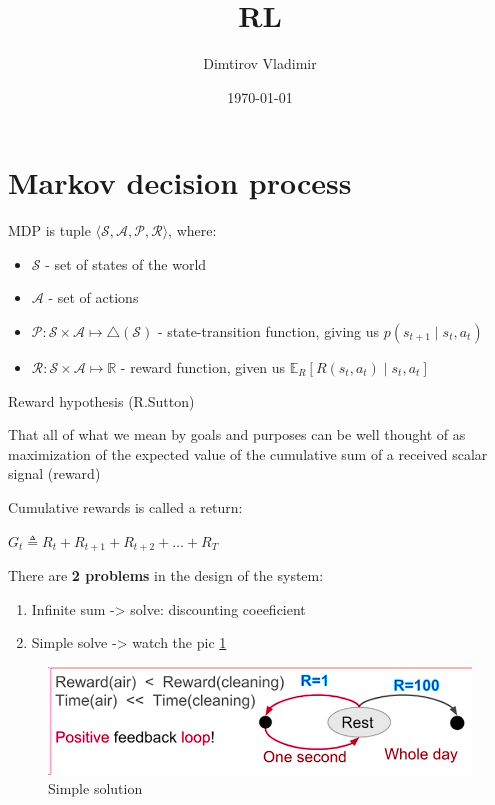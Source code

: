 \documentclass[a4paper,12pt]{article}
\title{RL}
\author{Dimtirov Vladimir}
\date{\today}
\begin{document}
	\maketitle
	\newpage
	\tableofcontents
	\newpage
	\section{Markov decision process}
	
	MDP is tuple $\langle\mathcal{S}, \mathcal{A}, \mathcal{P}, \mathcal{R}\rangle$, where:
	
	\begin{itemize}
		\item $\mathcal{S}$ - set of states of the world
		\item $\mathcal{A}$ - set of actions
		\item $\mathcal{P}: \mathcal{S} \times \mathcal{A} \mapsto \triangle(\mathcal{S})$ - state-transition function, giving us $p\left(s_{t+1} \mid s_t, a_t\right)$
		\item $\mathcal{R}: \mathcal{S} \times \mathcal{A} \mapsto \mathbb{R}$ - reward function, given us $\mathbb{E}_R\left[R\left(s_t, a_t\right) \mid s_t, a_t\right]$
	\end{itemize}
	
	Reward hypothesis (R.Sutton) 
	\begin{displayquote}
		That all of what we mean by goals and purposes can be well thought of as maximization of the expected value of the cumulative sum of a received scalar signal (reward)
	\end{displayquote}
	
	Cumulative rewards is called a return: 
	
	$G_t \triangleq R_t+R_{t+1}+R_{t+2}+\ldots+R_T$
	
	
	There are \textbf{2 problems} in the design of the system:
	\begin{enumerate}
		\item Infinite sum -> solve: discounting coeeficient 
		\item Simple solve -> watch the pic \ref{fig:screenshot001}
	\end{enumerate}
	
	\begin{figure}[H]
		\centering
		\includegraphics[width=1\linewidth]{../Image/screenshot001}
		\caption{Simple solution}
		\label{fig:screenshot001}
	\end{figure}
	
\end{document}

